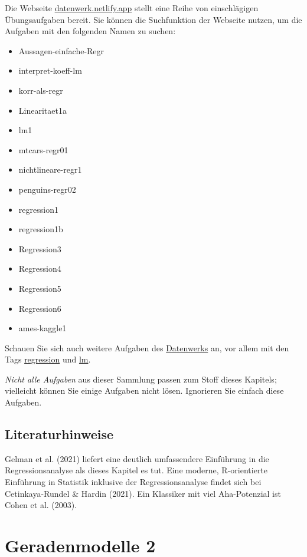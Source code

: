 \documentclass[
  letterpaper,
]{scrbook}
\providecommand{\tightlist}{%
  \setlength{\itemsep}{0pt}\setlength{\parskip}{0pt}}\usepackage{longtable,booktabs,array}
\theoremstyle{definition}
\theoremstyle{definition}
\theoremstyle{definition}
\theoremstyle{remark}
\begin{document}
Die Webseite \href{https://datenwerk.netlify.app}{datenwerk.netlify.app}
stellt eine Reihe von einschlägigen Übungsaufgaben bereit. Sie können
die Suchfunktion der Webseite nutzen, um die Aufgaben mit den folgenden
Namen zu suchen:

\begin{itemize}
\tightlist
\item
  Aussagen-einfache-Regr
\item
  interpret-koeff-lm
\item
  korr-als-regr
\item
  Linearitaet1a
\item
  lm1
\item
  mtcars-regr01
\item
  nichtlineare-regr1
\item
  penguins-regr02
\item
  regression1
\item
  regression1b
\item
  Regression3
\item
  Regression4
\item
  Regression5
\item
  Regression6
\item
  ames-kaggle1
\end{itemize}

Schauen Sie sich auch weitere Aufgaben des
\href{https://sebastiansauer.github.io/Datenwerk/}{Datenwerks} an, vor
allem mit den Tags
\href{https://sebastiansauer.github.io/Datenwerk/\#category=regression}{regression}
und \href{https://sebastiansauer.github.io/Datenwerk/\#category=lm}{lm}.

\emph{Nicht alle Aufgaben} aus dieser Sammlung passen zum Stoff dieses
Kapitels; vielleicht können Sie einige Aufgaben nicht lösen. Ignorieren
Sie einfach diese Aufgaben.

\section{Literaturhinweise}\label{literaturhinweise-7}

Gelman et al. (2021) liefert eine deutlich umfassendere Einführung in
die Regressionsanalyse als dieses Kapitel es tut. Eine moderne,
R-orientierte Einführung in Statistik inklusive der Regressionsanalyse
findet sich bei Cetinkaya-Rundel \& Hardin (2021). Ein Klassiker mit
viel Aha-Potenzial ist Cohen et al. (2003).

\chapter{Geradenmodelle 2}\label{geradenmodelle-2}
\end{document}
